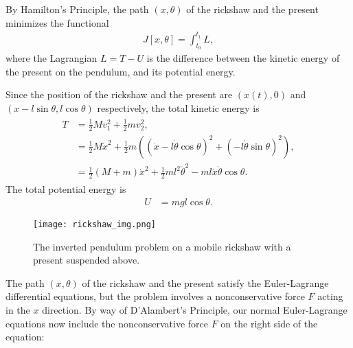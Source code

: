 By Hamilton's Principle, the path $(x,\theta)$ of the rickshaw and the present minimizes the functional 
\begin{align}
J[x,\theta] = \int_{t_0}^{t_1}	L,
\end{align}
where the Lagrangian $L = T - U$ is the difference between the kinetic energy of the present on the pendulum, and its potential energy.

Since the position of the rickshaw and the present are $(x(t),0)$ and $(x-l\sin \theta, l\cos \theta)$ respectively, the total kinetic energy is 
\begin{align}
	\begin{split}
	T &= \frac{1}{2}Mv_1^2 +  \frac{1}{2}mv_2^2,\\
	&= \frac{1}{2}M\dot{x}^2 +  \frac{1}{2}m((\dot{x} - l\dot{\theta}\cos \theta)^2 + (- l\dot{\theta}\sin \theta)^2),\\
	&= \frac{1}{2}(M+m)\dot{x}^2 +\frac{1}{2}m l^2\dot{\theta}^2-ml\dot{x}\dot{\theta}\cos \theta.
	\end{split}
\end{align}
The total potential energy is 
\begin{align*}
U &= mgl\cos \theta.
\end{align*}

\begin{figure}
\centering
\texttt{[image: rickshaw\_img.png]}
\caption{The inverted pendulum problem on a mobile rickshaw with a present suspended above.
}
\label{fig:inverted_pendulum:rickshaw_diagram}
\end{figure}

The path $(x,\theta)$ of the rickshaw and the present satisfy the Euler-Lagrange differential equations, but the problem involves a nonconservative force $F$ acting in the $x$ direction.
By way of D'Alambert's Principle, our normal Euler-Lagrange equations now include the nonconservative force $F$ on the right side of the equation:

